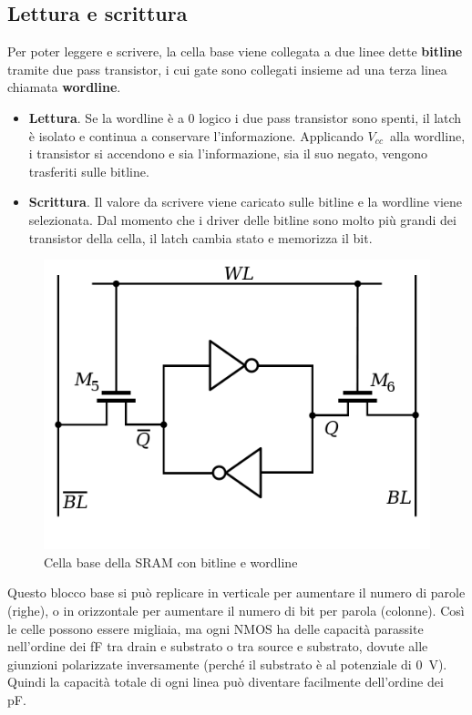 \documentclass[11pt,4paper]{report}
\newcommand{\vcc}{$V_{cc}$}
\begin{document}
\subsection{Lettura e scrittura}
Per poter leggere e scrivere, la cella base viene collegata a due linee dette \textbf{bitline} tramite due pass transistor, i cui gate sono collegati insieme ad una terza linea chiamata \textbf{wordline}.
\begin{itemize}
	\item \textbf{Lettura}. Se la wordline è a 0 logico i due pass transistor sono spenti, il latch è isolato e continua a conservare l'informazione. Applicando \vcc\ alla wordline, i transistor si accendono e sia l'informazione, sia il suo negato, vengono trasferiti sulle bitline. 
	\item \textbf{Scrittura}. Il valore da scrivere viene caricato sulle bitline e la wordline viene selezionata. Dal momento che i driver delle bitline sono molto più grandi dei transistor della cella, il latch cambia stato e memorizza il bit.
\end{itemize}

\begin{figure}[H]
	\centering
	\includegraphics[width=0.6\linewidth]{memorie/SRAM_Cell_Inverter_Loop.png}
	\caption{Cella base della SRAM con bitline e wordline}
	\label{fig:SRAMcell}
\end{figure}

Questo blocco base si può replicare in verticale per aumentare il numero di parole (righe), o in orizzontale per aumentare il numero di bit per parola (colonne). Così le celle possono essere migliaia, ma ogni NMOS ha delle capacità parassite nell'ordine dei \si{\femto\farad} tra drain e substrato o tra source e substrato, dovute alle giunzioni polarizzate inversamente (perché il substrato è al potenziale di \SI{0}{\volt}). Quindi la capacità totale di ogni linea può diventare facilmente dell'ordine dei \si{\pico\farad}. 
\end{document}
